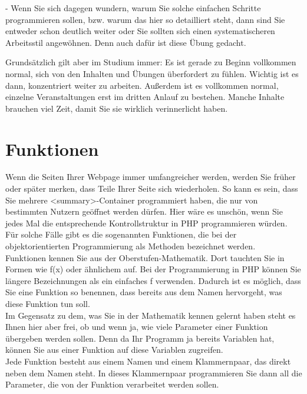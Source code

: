 -	Wenn Sie sich dagegen wundern, warum Sie solche einfachen Schritte programmieren sollen, bzw. warum das hier so detailliert steht, dann sind Sie entweder schon deutlich weiter oder Sie sollten sich einen systematischeren Arbeitsstil angewöhnen. Denn auch dafür ist diese Übung gedacht.

Grundsätzlich gilt aber im Studium immer: Es ist gerade zu Beginn vollkommen normal, sich von den Inhalten und Übungen überfordert zu fühlen. Wichtig ist es dann, konzentriert weiter zu arbeiten. Außerdem ist es vollkommen normal, einzelne Veranstaltungen erst im dritten Anlauf zu bestehen. Manche Inhalte brauchen viel Zeit, damit Sie sie wirklich verinnerlicht haben.

\section{Funktionen}

Wenn die Seiten Ihrer Webpage immer umfangreicher werden, werden Sie früher oder später merken, dass Teile Ihrer Seite sich wiederholen. So kann es sein, dass Sie mehrere <summary>-Container programmiert haben, die nur von bestimmten Nutzern geöffnet werden dürfen. Hier wäre es unschön, wenn Sie jedes Mal die entsprechende Kontrollstruktur in PHP programmieren würden. Für solche Fälle gibt es die sogenannten Funktionen, die bei der objektorientierten Programmierung als Methoden bezeichnet werden.\\

Funktionen kennen Sie aus der Oberstufen-Mathematik. Dort tauchten Sie in Formen wie f(x) oder ähnlichem auf. Bei der Programmierung in PHP können Sie längere Bezeichnungen als ein einfaches f verwenden. Dadurch ist es möglich, dass Sie eine Funktion so benennen, dass bereits aus dem Namen hervorgeht, was diese Funktion tun soll.\\

Im Gegensatz zu dem, was Sie in der Mathematik kennen gelernt haben steht es Ihnen hier aber frei, ob und wenn ja, wie viele Parameter einer Funktion übergeben werden sollen. Denn da Ihr Programm ja bereits Variablen hat, können Sie aus einer Funktion auf diese Variablen zugreifen.\\

Jede Funktion besteht aus einem Namen und einem Klammernpaar, das direkt neben dem Namen steht. In dieses Klammernpaar programmieren Sie dann all die Parameter, die von der Funktion verarbeitet werden sollen.\\

